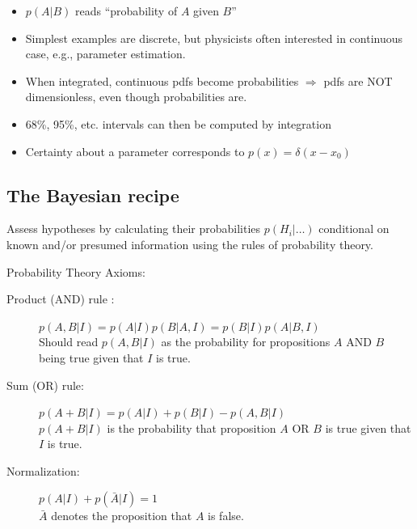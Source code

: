 \documentclass[%
oneside,                 %
final,                   %
10pt]{article}
\newenvironment{block_mdfboxadmon}[1][]{
\begin{block_mdfboxmdframed}[frametitle=#1]
}
{
\end{block_mdfboxmdframed}
}
\begin{document}
\begin{block_mdfboxadmon}[]

\begin{itemize}
 \item $p(A|B)$ reads “probability of $A$ given $B$”

 \item Simplest examples are discrete, but physicists often interested in continuous case, e.g., parameter estimation.

 \item When integrated, continuous pdfs become probabilities $\Rightarrow$ pdfs are NOT dimensionless, even though probabilities are.

 \item 68\%, 95\%, etc. intervals can then be computed by integration 

 \item Certainty about a parameter corresponds to $p(x) = \delta(x-x_0)$
\end{itemize}

\noindent
\end{block_mdfboxadmon} %



\subsection{The Bayesian recipe}

\begin{block_mdfboxadmon}[]
Assess hypotheses by calculating their probabilities $p(H_i | \ldots)$ conditional on known and/or presumed information using the rules of probability theory.
\end{block_mdfboxadmon} %




\begin{block_mdfboxadmon}[]
Probability Theory Axioms:
\begin{description}
\item[Product (AND) rule :] 
  $p(A, B | I) = p(A|I) p(B|A, I) = p(B|I)p(A|B,I)$\\
  Should read $p(A,B|I)$ as the probability for propositions $A$ AND $B$ being true given that $I$ is true.

\item[Sum (OR) rule:] 
  $p(A + B | I) = p(A | I) + p(B | I) - p(A, B | I)$\\
  $p(A+B|I)$ is the probability that proposition $A$ OR $B$ is true given that $I$ is true.

\item[Normalization:] 
  $p(A|I) + p(\bar{A}|I) = 1$\\
  $\bar{A}$ denotes the proposition that $A$ is false.
\end{description}

\noindent
\end{block_mdfboxadmon} %
\end{document}

